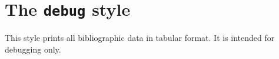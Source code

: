 \documentclass[a4paper]{article}
\begin{document}
\section*{The \texttt{debug} style}

This style prints all bibliographic data in tabular format. It is
intended for debugging only.

\clearpage

\nocite{companion}
\printbibliography
\end{document}
